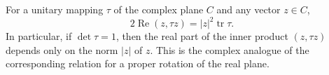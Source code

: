 For a unitary mapping $\tau$ of the complex plane $C$ and any vector $z \in C$,
$$
2 \operatorname{Re} (z, \tau z) = |z|^2 \operatorname{tr} \tau.
$$
In particular, if $\det \tau = 1$, then the real part of the inner product $(z, \tau z)$ depends only on the norm $|z|$ of $z$. This is the complex analogue of the corresponding relation for a proper rotation of the real plane.
